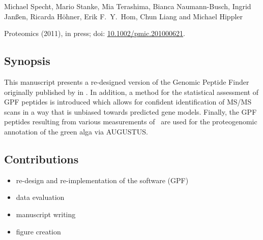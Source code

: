 Michael Specht, Mario Stanke, Mia Terashima, Bianca Naumann-Busch, Ingrid Janßen, Ricarda H\"ohner, Erik F.~Y.~Hom, Chun Liang and Michael Hippler

Proteomics (2011), in press; doi: \href{http://dx.doi.org/10.1002/pmic.201000621}{10.1002/pmic.201000621}.

\label{paper:gpf}

\subsection*{Synopsis}

This manuscript presents a re-designed version of the Genomic Peptide Finder
originally published by \citeauthor{Allmer2004} in \citeyear{Allmer2004}.
In addition, a method for the statistical assessment of GPF peptides is
introduced which allows for confident identification of MS/MS scans in a
way that is unbiased towards predicted gene models.
Finally, the GPF peptides resulting from various measurements of \cre~are used 
for the proteogenomic annotation of the green alga via AUGUSTUS.

\subsection*{Contributions}

\begin{itemize}
\item re-design and re-implementation of the software (GPF)
\item data evaluation
\item manuscript writing
\item figure creation
\end{itemize}

\cleardoublepage
{}

% 
% 
% 

